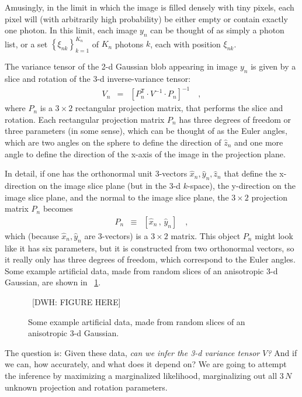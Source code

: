 \documentclass[12pt]{article}
\newcommand{\unitvec}[1]{\hat{#1}}
\newcommand{\xhat}{\unitvec{x}}
\newcommand{\yhat}{\unitvec{y}}
\newcommand{\zhat}{\unitvec{z}}
\newcommand{\transpose}{^{\mathsf{T}}}
\newcommand{\setof}[1]{\left\{{#1}\right\}}
\begin{document}
Amusingly, in the limit in which the image is filled densely with
tiny pixels, each pixel will (with arbitrarily high probability) be
either empty or contain exactly one photon.
In this limit, each image $y_n$ can be thought of as simply a photon
list, or a set $\setof{\xi_{nk}}_{k=1}^{K_n}$ of $K_n$ photons $k$,
each with position $\xi_{nk}$.

The variance tensor of the 2-d Gaussian blob appearing in image $y_n$
is given by a slice and rotation of the 3-d inverse-variance tensor:
\begin{eqnarray}
  V_n &=& [P_n\transpose\cdot V^{-1}\cdot P_n]^{-1}
  \quad ,
\end{eqnarray}
where $P_n$ is a $3\times 2$ rectangular projection matrix, that
performs the slice and rotation.
Each rectangular projection matrix $P_n$ has three degrees of freedom or three
parameters (in some sense), which can be thought of as the Euler
angles, which are two angles on the sphere to define the direction of
$\zhat_n$ and one more angle to define the direction of the x-axis of
the image in the projection plane.

In detail, if one has the orthonormal unit 3-vectors
$\xhat_n,\yhat_n,\zhat_n$ that define the x-direction on the image
slice plane (but in the 3-d $k$-space), the y-direction on the image
slice plane, and the normal to the image slice plane, the $3\times 2$
projection matrix $P_n$ becomes
\begin{eqnarray}
  P_n &\equiv& [\xhat_n\,,\,\yhat_n]
  \quad ,
\end{eqnarray}
which (because $\xhat_n,\yhat_n$ are 3-vectors) is a $3\times2$ matrix.
This object $P_n$ might look like it has six parameters, but it is
constructed from two orthonormal vectors, so it really only has three
degrees of freedom, which correspond to the Euler angles.
Some example artificial data, made from random slices of an
anisotropic 3-d Gaussian, are shown in
\figurename~\ref{fig:exampledata}.
\begin{figure}[p]
~[DWH: FIGURE HERE]~
\caption{Some example artificial data, made from random slices of an
anisotropic 3-d Gaussian.\label{fig:exampledata}}
\end{figure}

The question is:
Given these data, \emph{can we infer the 3-d variance tensor $V$?}
And if we can, how accurately, and what does it depend on?  We are
going to attempt the inference by maximizing a marginalized
likelihood, marginalizing out all $3\,N$ unknown projection and
rotation parameters.
\end{document}
